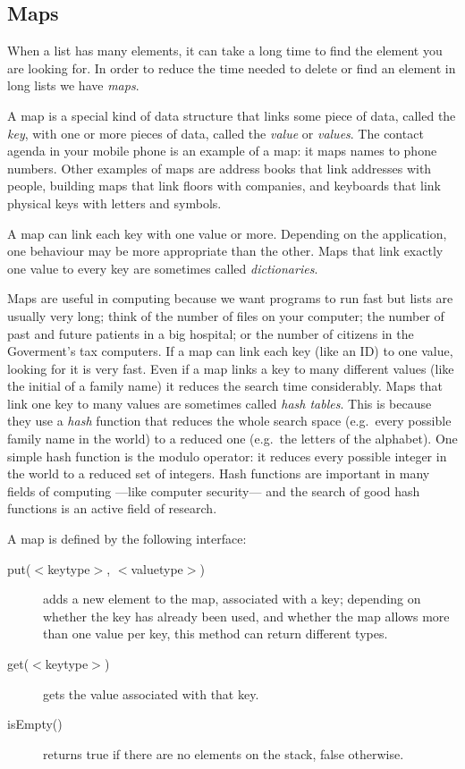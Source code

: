 \subsection{Maps}
\label{sec:map}

When a list has many elements, it can take a long time to find the
element you are looking for. In order to reduce the time needed to
delete or find an element in long lists we have \emph{maps}.

A map is a special kind of data structure that links some piece of
data, called the \emph{key}, with one or more pieces of data, called
the \emph{value} or \emph{values}. The contact agenda in your mobile
phone is an example of a map: it maps names to phone numbers. Other
examples of maps are address books that link addresses with people,
building maps that link floors with companies, and keyboards that link
physical keys with letters and symbols. 

A map can link each key with one value or more. Depending on the
application, one behaviour may be more appropriate than the
other. Maps that link exactly one value to every key are sometimes
called \emph{dictionaries}. 

Maps are useful in computing because we want programs to run fast but
lists are usually very long; think of the number of files on your
computer; the number of past and future patients in a big hospital; or
the number of citizens in the Goverment's tax computers. If a map can
link each key (like an ID) to one value, looking for it is very
fast. Even if a map links a key to many different values (like the
initial of a family name) it reduces the search time
considerably. Maps that link one key to many values are sometimes
called \emph{hash tables}. This is because they use a \emph{hash}
function that reduces the whole search space (e.g.~every possible
family name in the world) to a reduced one (e.g.~the letters of the
alphabet). One simple hash function is the modulo operator: it reduces
every possible integer in the world to a reduced set of integers. Hash
functions are important in many fields of computing ---like computer
security--- and the search of good hash functions is an active field of
research. 

A map is defined by the following interface: 

\begin{description}
\item[put($<$keytype$>$, $<$valuetype$>$)] adds a new element to the
  map, associated with a key; depending on whether the key has already
  been used, and whether the map allows more than one value per key,
  this method can return different types. 
\item[get($<$keytype$>$) ] gets the value associated with that key.
\item[isEmpty() ] returns true if there are no elements on the stack,
  false otherwise.
\end{description}






